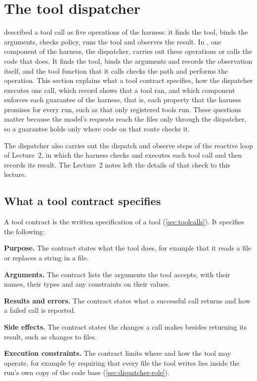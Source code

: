 \section{The tool dispatcher}
\label{sec:dispatcher}

 described a tool call as five operations of the harness: it finds the tool,
binds the arguments, checks policy, runs the tool and observes the result. In \msa{}, one component
of the harness, the dispatcher, carries out these operations or calls the code that does. It finds
the tool, binds the arguments and records the observation itself, and the tool function that it
calls checks the path and performs the operation. This section explains what a tool contract
specifies, how the dispatcher executes one call, which record shows that a tool ran, and which
component enforces each guarantee of the harness, that is, each property that the harness promises
for every run, such as that only registered tools run. These questions matter because the model's
requests reach the files only through the dispatcher, so a guarantee holds only where code on that
route checks it.

The dispatcher also carries out the dispatch and observe steps of the reactive loop of Lecture~2, in
which the harness checks and executes each tool call and then records its result. The Lecture~2
notes left the details of that check to this lecture.

\subsection{What a tool contract specifies}
\label{sec:dispatcher-contract}

A tool contract is the written specification of a tool (\cref{sec:toolcalls}). It specifies the
following:
\bi
\item \textbf{Purpose.} The contract states what the tool does, for example that it reads a file or
replaces a string in a file.
\item \textbf{Arguments.} The contract lists the arguments the tool accepts, with their names, their
types and any constraints on their values.
\item \textbf{Results and errors.} The contract states what a successful call returns and how a
failed call is reported.
\item \textbf{Side effects.} The contract states the changes a call makes besides returning its
result, such as changes to files.
\item \textbf{Execution constraints.} The contract limits where and how the tool may operate, for
example by requiring that every file the tool writes lies inside the run's own copy of the code
base (\cref{sec:dispatcher-role}).
\ei


